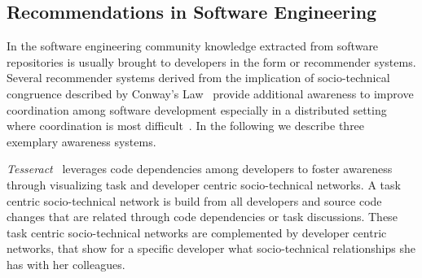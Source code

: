 



\subsection{Recommendations in Software Engineering}
In the software engineering community knowledge extracted from software repositories is usually brought to developers in the form or recommender systems.
Several recommender systems derived from the implication of socio-technical congruence described by Conway's Law~\cite{conway:datamination:1968} provide additional awareness to improve coordination among software development especially in a distributed setting where coordination is most difficult~\cite{olson:hci:2000}.
In the following we describe three exemplary awareness systems.



\emph{Tesseract}~\cite{sarma:icse:2009} leverages code dependencies among developers to foster awareness through visualizing task and developer centric socio-technical networks.
A task centric socio-technical network is build from all developers and source code changes that are related through code dependencies or task discussions.
These task centric socio-technical networks are complemented by developer centric networks, that show for a specific developer what  socio-technical relationships she has with her colleagues.

